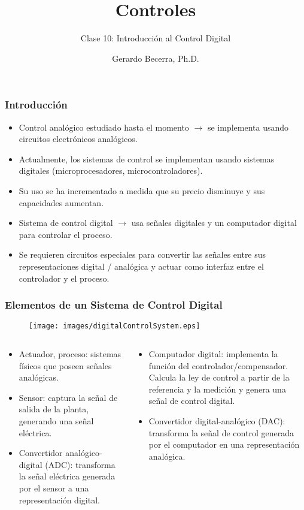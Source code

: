 \documentclass[aspectratio=169,handout]{beamer}
\title{Controles}
\subtitle{\small Clase 10: Introducción al Control Digital}
\author{Gerardo Becerra, Ph.D.}
\institute{Pontificia Universidad Javeriana\\ Departamento de Electrónica}
\date{}
\theoremstyle{definition}
\theoremstyle{plain}
\theoremstyle{remark}
\begin{document}
\frame{\titlepage}	

\begin{frame}[<+->]\frametitle{Introducción}
\centering
\begin{itemize}
	\item Control analógico estudiado hasta el momento $\rightarrow$ se implementa usando circuitos electrónicos analógicos.
	\item Actualmente, los sistemas de control se implementan usando sistemas digitales (microprocesadores, microcontroladores).
	\item Su uso se ha incrementado a medida que su precio disminuye y sus capacidades aumentan.
	\item Sistema de control digital $\rightarrow$ usa señales digitales y un computador digital para controlar el proceso.
	\item Se requieren circuitos especiales para convertir las señales entre sus representaciones digital / analógica y actuar como interfaz entre el controlador y el proceso.
\end{itemize}
\end{frame}

\begin{frame}[<+->]\frametitle{Elementos de un Sistema de Control Digital}
	\begin{figure}[h]
		\centering
		\texttt{[image: images/digitalControlSystem.eps]}
	\end{figure}
	\small
	\vspace*{-2mm}
	\begin{columns}
		\begin{column}{0.5\textwidth}
			\begin{itemize}
				\item Actuador, proceso: sistemas físicos que poseen señales analógicas.
				\item Sensor: captura la señal de salida de la planta, generando una señal eléctrica.
				\item Convertidor analógico-digital (ADC): transforma la señal eléctrica generada por el sensor a una representación digital.
			\end{itemize}
		\end{column}
		\begin{column}{0.5\textwidth}
			\begin{itemize}
				\item Computador digital: implementa la función del controlador/compensador. Calcula la ley de control a partir de la referencia y la medición y genera una señal de control digital.
				\item Convertidor digital-analógico (DAC): transforma la señal de control generada por el computador en una representación analógica.
			\end{itemize}
		\end{column}
	\end{columns}
\end{frame}
\end{document}
